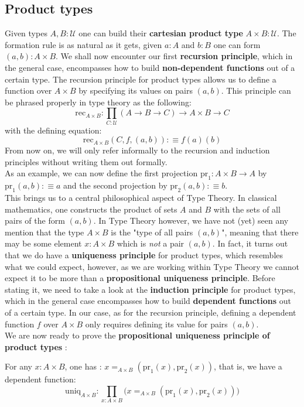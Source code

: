 \documentclass{report}
\begin{document}
\subsection{Product types}
Given types $A,B : \mathcal{U}$ one can build their \textbf{cartesian product type} $A \times B : \mathcal{U}$. The formation rule is as natural as it gets, given $a : A$ and $b : B$ one can form $(a,b) : A \times B$. We shall now encounter our first \textbf{recursion principle}, which in the general case, encompasses how to build \textbf{non-dependent functions} out of a certain type. The recursion principle for product types allows us to define a function over $A\times B$ by specifying its values on pairs $(a,b)$. This principle can be phrased properly in type theory as the following:
$$\mathrm{rec}_{A\times B} : \prod_{C : \mathcal{U}} (A \rightarrow B \rightarrow C) \rightarrow A\times B \rightarrow C$$
with the defining equation:
$$\mathrm{rec}_{A\times B}(C,f,(a,b)) :\equiv f(a)(b)$$ 
From now on, we will only refer informally to the recursion and induction principles without writing them out formally.\\
As an example, we can now define the first projection $\mathrm{pr}_1 : A\times B \rightarrow A$ by $\mathrm{pr}_1(a,b) :\equiv a$ and the second projection by $\mathrm{pr}_2 (a,b) :\equiv b$.\\ 
This brings us to a central philosophical aspect of Type Theory. In classical mathematics, one constructs the product of sets $A$ and $B$ with the sets of all pairs of the form $(a,b)$. In Type Theory however, we have not (yet) seen any mention that the type $A\times B$ is the "type of all pairs $(a,b)$", meaning that there may be some element $x : A \times B$ which is \textit{not} a pair $(a,b)$. In fact, it turns out that we do have a \textbf{uniqueness principle} for product types, which resembles what we could expect, however, as we are working within Type Theory we cannot expect it to be more than a \textbf{propositional uniqueness principle}. Before stating it, we need to take a look at the \textbf{induction principle} for product types, which in the general case encompasses how to build \textbf{dependent functions} out of a certain type. In our case, as for the recursion principle, defining a dependent function $f$ over $A \times B$ only requires defining its value for pairs $(a,b)$.\\
We are now ready to prove the \textbf{propositional uniqueness principle of product types} :
\begin{prop}
  For any $x : A \times B$, one has : $x =_{A \times B} (\mathrm{pr}_1(x),\mathrm{pr}_2(x))$, that is, we have a dependent function:
  $$\mathrm{uniq}_{A\times B} : \prod_{x : A \times B} \big(x =_{A \times B} (\mathrm{pr}_1(x),\mathrm{pr}_2(x))\big)$$
\end{prop}
\end{document}
